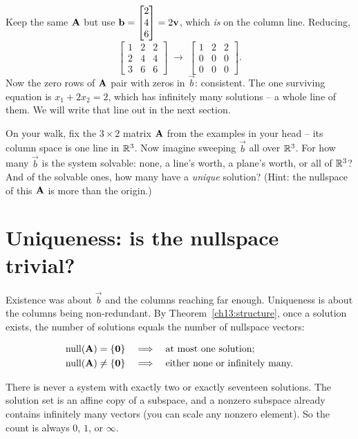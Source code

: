 \begin{example}
\label{ch13:con}
Keep the same $\mathbf{A}$ but use $\mathbf{b}=\begin{bmatrix}2\\4\\6\end{bmatrix}=2\mathbf{v}$, which
\emph{is} on the column line. Reducing,
\[
  \left[\begin{array}{cc|c}1&2&2\\2&4&4\\3&6&6\end{array}\right]
  \;\longrightarrow\;
  \left[\begin{array}{cc|c}1&2&2\\0&0&0\\0&0&0\end{array}\right].
\]
Now the zero rows of $\mathbf{A}$ pair with zeros in $\vec{b}$: consistent. The one surviving
equation is $x_1+2x_2=2$, which has infinitely many solutions -- a whole line of them. We
will write that line out in the next section.
\end{example}

\begin{walkbox}
On your walk, fix the $3\times2$ matrix $\mathbf{A}$ from the examples in your head -- its
column space is one line in $\mathbb{R}^3$. Now imagine sweeping $\vec{b}$ all over $\mathbb{R}^3$. For how
many $\vec{b}$ is the system solvable: none, a line's worth, a plane's worth, or all of
$\mathbb{R}^3$? And of the solvable ones, how many have a \emph{unique} solution? (Hint: the
nullspace of this $\mathbf{A}$ is more than the origin.)
\end{walkbox}

\section{Uniqueness: is the nullspace trivial?}

Existence was about $\vec{b}$ and the columns reaching far enough. Uniqueness is about the
columns being non-redundant. By Theorem~\ref{ch13:structure}, once a solution exists, the
number of solutions equals the number of nullspace vectors:

\begin{align*}
  \operatorname{null}(\mathbf{A})&=\{\mathbf{0}\} &&\Longrightarrow\quad \text{at most one solution;}\\
  \operatorname{null}(\mathbf{A})&\neq\{\mathbf{0}\} &&\Longrightarrow\quad \text{either none or infinitely many.}
\end{align*}

There is never a system with exactly two or exactly seventeen solutions. The solution set
is an affine copy of a subspace, and a nonzero subspace already contains infinitely many
vectors (you can scale any nonzero element). So the count is always $0$, $1$, or $\infty$.

